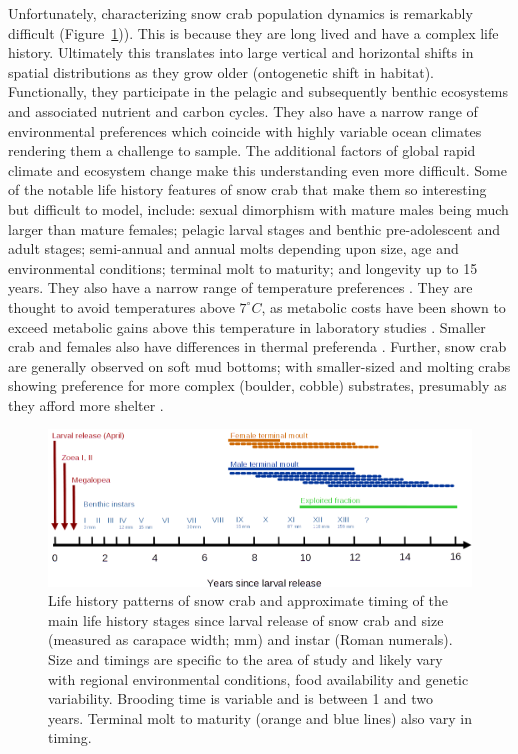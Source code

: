 \documentclass[
	letterpaper, %
	10pt, %
]{article}
\begin{document}
Unfortunately, characterizing snow crab population dynamics is remarkably difficult (Figure~\ref{fig2})). This is because they are long lived and have a complex life history. Ultimately this translates into large vertical and horizontal shifts in spatial distributions as they grow older (ontogenetic shift in habitat). Functionally, they participate in the pelagic and subsequently benthic ecosystems and associated nutrient and carbon cycles. They also have a narrow range of environmental preferences which coincide with highly variable ocean climates rendering them a challenge to sample. The additional factors of global rapid climate and ecosystem change make this understanding even more difficult. Some of the notable life history features of snow crab that make them so interesting but difficult to model, include: sexual dimorphism with mature males being much larger than mature females; pelagic larval stages and benthic pre-adolescent and adult stages; semi-annual and annual molts depending upon size, age and environmental conditions; terminal molt to maturity; and longevity up to 15 years. They also have a narrow range
of temperature preferences \cite{Foyle_et_al_1989, Sainte-Marie_Lafrance_2002, Kuhn_Choi_2011}. 
They are thought to avoid temperatures above $7^{\circ}C$, as metabolic costs have been shown to exceed metabolic gains
above this temperature in laboratory studies \cite{Foyle_et_al_1989}. Smaller crab and
females also have differences in thermal preferenda \cite{Choi_et_al_2022}. Further,
snow crab are generally observed on soft mud bottoms; with
smaller-sized and molting crabs showing preference for more complex
(boulder, cobble) substrates, presumably as they afford more shelter
\cite{Sainte-Marie_Hazel_1992, Comeau_et_al_1998}.
	
\begin{figure}
	\includegraphics[width=\linewidth]{media/life_history.png}
	\caption{Life history patterns of snow crab and approximate timing
	of the main life history stages since larval release of snow crab and size (measured as
	carapace width; mm) and instar (Roman numerals). Size and timings
	are specific to the area of study and likely vary with regional environmental
	conditions, food availability and genetic variability. Brooding time is variable and is between 1 and two years. Terminal molt to maturity (orange and blue lines) also vary in timing.}
	\label{fig2}
	\end{figure}   
	 
\end{document}

